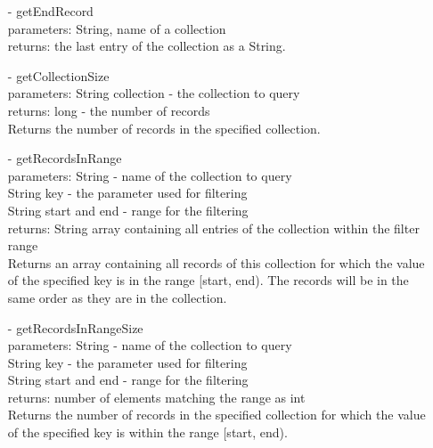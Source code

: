 \documentclass[oneside, english, final]{design}
\begin{document}
\begin{itemize}
\begin{itemize}
		      \item[-]getEndRecord
		            \\parameters: String, name of a collection
		            \\returns: the last entry of the collection as a String.

		      \item[-]getCollectionSize
		            \\parameters: String collection - the collection to query
		            \\returns: long - the number of records
		            \\Returns the number of records in the specified collection.

		      \item[-]getRecordsInRange
		            \\parameters: String - name of the collection to query
		            \\String key - the parameter used for filtering
		            \\String start and end - range for the filtering
		            \\returns: String array containing all entries of the collection within the filter range
		            \\ Returns an array containing all records of this
		            collection for which the value of the
		            specified key is in the range [start, end).
		            The records will be in the same order as
		            they are in the collection.

		      \item[-]getRecordsInRangeSize
		            \\parameters: String - name of the collection to query
		            \\String key - the parameter used for filtering
		            \\String start and end - range for the filtering
		            \\returns: number of elements matching the range as int
		            \\Returns the number of records in the specified
		            collection for which the value of the specified
		            key is within the range [start, end).

	      \end{itemize}

	      \newpage


\end{itemize}
\end{document}
